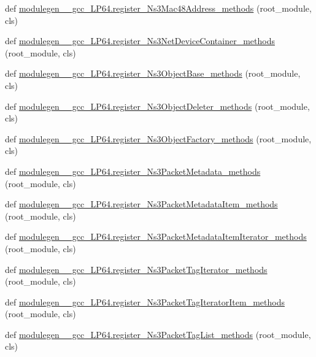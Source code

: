 \begin{DoxyCompactItemize}
\item 
def \hyperlink{namespacemodulegen____gcc__LP64_aa406a8e967bb0e5456a51fcef1ec276b}{modulegen\+\_\+\+\_\+gcc\+\_\+\+L\+P64.\+register\+\_\+\+Ns3\+Mac48\+Address\+\_\+methods} (root\+\_\+module, cls)
\item 
def \hyperlink{namespacemodulegen____gcc__LP64_a43937d11569618c76bf10e334e87f976}{modulegen\+\_\+\+\_\+gcc\+\_\+\+L\+P64.\+register\+\_\+\+Ns3\+Net\+Device\+Container\+\_\+methods} (root\+\_\+module, cls)
\item 
def \hyperlink{namespacemodulegen____gcc__LP64_a811b76d9911bfa2ed025b14b9a8aeb50}{modulegen\+\_\+\+\_\+gcc\+\_\+\+L\+P64.\+register\+\_\+\+Ns3\+Object\+Base\+\_\+methods} (root\+\_\+module, cls)
\item 
def \hyperlink{namespacemodulegen____gcc__LP64_ae02c1fc1dc3e8ca9071dee347b82eae5}{modulegen\+\_\+\+\_\+gcc\+\_\+\+L\+P64.\+register\+\_\+\+Ns3\+Object\+Deleter\+\_\+methods} (root\+\_\+module, cls)
\item 
def \hyperlink{namespacemodulegen____gcc__LP64_a786202f6865813272a2645524e567a31}{modulegen\+\_\+\+\_\+gcc\+\_\+\+L\+P64.\+register\+\_\+\+Ns3\+Object\+Factory\+\_\+methods} (root\+\_\+module, cls)
\item 
def \hyperlink{namespacemodulegen____gcc__LP64_a1389373aaae60b11eca14fb1daaa350f}{modulegen\+\_\+\+\_\+gcc\+\_\+\+L\+P64.\+register\+\_\+\+Ns3\+Packet\+Metadata\+\_\+methods} (root\+\_\+module, cls)
\item 
def \hyperlink{namespacemodulegen____gcc__LP64_a2ac7c9819f0a71366e0cb996f16c2232}{modulegen\+\_\+\+\_\+gcc\+\_\+\+L\+P64.\+register\+\_\+\+Ns3\+Packet\+Metadata\+Item\+\_\+methods} (root\+\_\+module, cls)
\item 
def \hyperlink{namespacemodulegen____gcc__LP64_ad75a5ba1c89bf75f399491ebc4bc2299}{modulegen\+\_\+\+\_\+gcc\+\_\+\+L\+P64.\+register\+\_\+\+Ns3\+Packet\+Metadata\+Item\+Iterator\+\_\+methods} (root\+\_\+module, cls)
\item 
def \hyperlink{namespacemodulegen____gcc__LP64_a1d07a5663a331363a6765890f7c3f7ad}{modulegen\+\_\+\+\_\+gcc\+\_\+\+L\+P64.\+register\+\_\+\+Ns3\+Packet\+Tag\+Iterator\+\_\+methods} (root\+\_\+module, cls)
\item 
def \hyperlink{namespacemodulegen____gcc__LP64_af0346c019adfcbf415a97ec6cff465e1}{modulegen\+\_\+\+\_\+gcc\+\_\+\+L\+P64.\+register\+\_\+\+Ns3\+Packet\+Tag\+Iterator\+Item\+\_\+methods} (root\+\_\+module, cls)
\item 
def \hyperlink{namespacemodulegen____gcc__LP64_a96f93e9ac4cca72d9c82bad3ed221800}{modulegen\+\_\+\+\_\+gcc\+\_\+\+L\+P64.\+register\+\_\+\+Ns3\+Packet\+Tag\+List\+\_\+methods} (root\+\_\+module, cls)

\end{DoxyCompactItemize}
